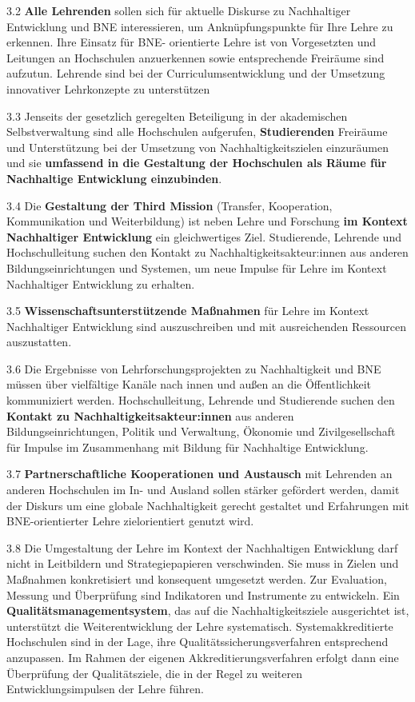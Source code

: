 \documentclass[DIV=12]{scrartcl}
\begin{document}
3.2 \textbf{Alle Lehrenden} sollen sich für aktuelle Diskurse zu
Nachhaltiger Entwicklung und BNE interessieren, um Anknüpfungspunkte für
Ihre Lehre zu erkennen. Ihre Einsatz für BNE- orientierte Lehre ist von
Vorgesetzten und Leitungen an Hochschulen anzuerkennen sowie
entsprechende Freiräume sind aufzutun. Lehrende sind bei der
Curriculumsentwicklung und der Umsetzung innovativer Lehrkonzepte zu
unterstützen

3.3 Jenseits der gesetzlich geregelten Beteiligung in der akademischen
Selbstverwaltung sind alle Hochschulen aufgerufen, \textbf{Studierenden}
Freiräume und Unterstützung bei der Umsetzung von Nachhaltigkeitszielen
einzuräumen und sie \textbf{umfassend in die Gestaltung der Hochschulen
als Räume für Nachhaltige Entwicklung einzubinden}.

3.4 Die \textbf{Gestaltung der Third Mission} (Transfer, Kooperation,
Kommunikation und Weiterbildung) ist neben Lehre und Forschung
\textbf{im Kontext Nachhaltiger Entwicklung} ein gleichwertiges Ziel.
Studierende, Lehrende und Hochschulleitung suchen den Kontakt zu
Nachhaltigkeitsakteur:innen aus anderen Bildungseinrichtungen und
Systemen, um neue Impulse für Lehre im Kontext Nachhaltiger Entwicklung
zu erhalten.

3.5 \textbf{Wissenschaftsunterstützende Maßnahmen} für Lehre im Kontext
Nachhaltiger Entwicklung sind auszuschreiben und mit ausreichenden
Ressourcen auszustatten.

3.6 Die Ergebnisse von Lehrforschungsprojekten zu Nachhaltigkeit und BNE
müssen über vielfältige Kanäle nach innen und außen an die
Öffentlichkeit kommuniziert werden. Hochschulleitung, Lehrende und
Studierende suchen den \textbf{Kontakt zu Nachhaltigkeitsakteur:innen}
aus anderen Bildungseinrichtungen, Politik und Verwaltung, Ökonomie und
Zivilgesellschaft für Impulse im Zusammenhang mit Bildung für
Nachhaltige Entwicklung.

3.7 \textbf{Partnerschaftliche Kooperationen und Austausch} mit
Lehrenden an anderen Hochschulen im In- und Ausland sollen stärker
gefördert werden, damit der Diskurs um eine globale Nachhaltigkeit
gerecht gestaltet und Erfahrungen mit BNE-orientierter Lehre
zielorientiert genutzt wird.

3.8 Die Umgestaltung der Lehre im Kontext der Nachhaltigen Entwicklung
darf nicht in Leitbildern und Strategiepapieren verschwinden. Sie muss
in Zielen und Maßnahmen konkretisiert und konsequent umgesetzt werden.
Zur Evaluation, Messung und Überprüfung sind Indikatoren und Instrumente
zu entwickeln. Ein \textbf{Qualitätsmanagementsystem}, das auf die
Nachhaltigkeitsziele ausgerichtet ist, unterstützt die Weiterentwicklung
der Lehre systematisch. Systemakkreditierte Hochschulen sind in der
Lage, ihre Qualitätssicherungsverfahren entsprechend anzupassen. Im
Rahmen der eigenen Akkreditierungsverfahren erfolgt dann eine
Überprüfung der Qualitätsziele, die in der Regel zu weiteren
Entwicklungsimpulsen der Lehre führen.
\end{document}

